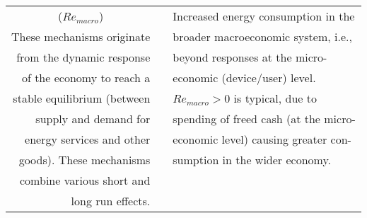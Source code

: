 \begin{table}
\begin{center}
\begin{tabular}{ r l l }
\multicolumn{1}{c}{($Re_{macro}$)} &                                              & Increased energy consumption in the  \\
These mechanisms originate         &                                              & broader macroeconomic system, i.e.,  \\
from the dynamic response          &                                              & beyond responses at the micro-  \\
of the economy to reach a          &                                              & economic (device/user) level. \\
stable equilibrium (between        &                                              & $Re_{macro} > 0$ is typical, due to   \\
supply and demand for              &                                              & spending of freed cash (at the micro-\\
energy services and other          &                                              & economic level) causing greater con- \\
goods). These mechanisms           &                                              & sumption in the wider economy. \\
combine various short and          &                                              &  \\
long run effects.                  &                                              &  \\
\bottomrule
\end{tabular}
\end{center}
\end{table}
